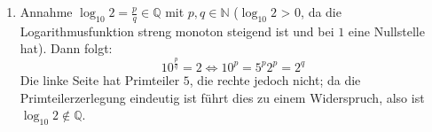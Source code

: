 \begin{enumerate}
\item Annahme $\log_{10} 2 = \frac{p}{q} \in \mathbb{Q}$ mit $p,q \in \mathbb{N}$ ($\log_{10} 2$ > 0, da
die Logarithmusfunktion streng monoton steigend ist und bei $1$ eine Nullstelle hat). Dann folgt:
\[ 10^{\frac{p}{q}} = 2 \Leftrightarrow 10^p = 5^p 2^p = 2^q \]
Die linke Seite hat Primteiler $5$, die rechte jedoch nicht; da die Primteilerzerlegung eindeutig ist
führt dies zu einem Widerspruch, also ist $\log_{10} 2 \not\in \mathbb{Q}$.
\end{enumerate}

